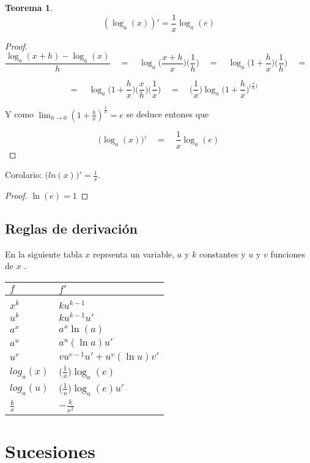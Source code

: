 \message{ !name(analisis-mat.tex)}\documentclass[12pt,a4paper]{article}
\newtheorem{theorem}{Teorema}[section]
\begin{document}
\begin{theorem}
\[ (\log_a(x))' = \frac{1}{x}\log_a(e) \]
\end{theorem}
\begin{proof}

\[ \frac{\log_a(x+h)-\log_a(x)}{h} \quad = \quad
\log_a\Big(\frac{x+h}{x}\Big)\Big(\frac{1}{h}\Big) \quad = \quad
\log_a\Big(1+\frac{h}{x}\Big)\Big(\frac{1}{h}\Big) \quad = \quad
 \]


\[  \quad = \quad \log_a\Big(1+\frac{h}{x}\Big)\Big(\frac{x}{h}\Big)\Big(\frac{1}{x}\Big)
 \quad = \quad
 \Big(\frac{1}{x}\Big)\log_a\Big(1+\frac{h}{x}\Big)^{\Big(\frac{x}{h}\Big)} \]

Y como \( \lim_{h \to 0}(1+\frac{h}{x})^{\frac{x}{h}}  =  e \) se
deduce entones que 


\[ \Big(\log_a(x)\Big)' \quad = \quad \frac{1}{x} \log_a(e) \]
\end{proof}
Corolario: \( \Big( ln(x) \Big)' = \frac{1}{x}.  \) 
\begin{proof}
\( \ln(e)=1 \) 
\end{proof}

\subsection{Reglas de derivaci\'on}
En la siguiente tabla \( x \) reprsenta un variable, \( a \) y \( k \) 
constantes y \( u \) y \( v \) funciones de \( x \) .

{\renewcommand{\arraystretch}{1.2} 
\begin{tabular}{l l}
\( f \)  & \( f' \) \\
\hline \\
\( x^k \) & \( ku^{k-1} \)  \\
\( u^k \)  & \( ku^{k-1}u' \)  \\
\( a^x \)  & \( a^x\ln(a) \)  \\
\( a^u \)  & \( a^u(\ln a)u' \)  \\
\( u^v \)  & \( vu^{v-1}u'+u^v(\ln u)v' \)  \\
\( log_a(x) \) & \(  \big(\frac{1}{x}\big)\log_a(e) \) \\
\( log_a(u) \) & \(  \big(\frac{1}{u}\big)\log_a(e)u' \) \\
\( \frac{k}{x} \) & \( -\frac{k}{x^2} \) \\
\end{tabular}
}
\section{Sucesiones}
\end{document}
